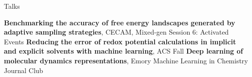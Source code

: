 \begin{rubric}{Talks}


\entry*[\hspace{1.05cm}2021] \textbf{Benchmarking the accuracy of free energy landscapes generated by adaptive sampling strategies}, CECAM, Mixed-gen Session 6: Activated Events
\entry*[\hspace{1.05cm}2021] \textbf{Reducing the error of redox potential calculations in implicit and explicit solvents with machine learning}, ACS Fall
\entry*[\hspace{1.05cm}2020] \textbf{Deep learning of molecular dynamics representations}, Emory Machine Learning in Chemistry Journal Club
\end{rubric}


